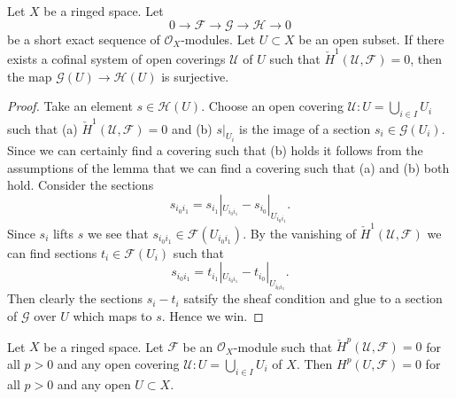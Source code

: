 \begin{lemma}
\label{lemma-ses-cech-h1}
Let $X$ be a ringed space.
Let
$$
0 \to \mathcal{F} \to \mathcal{G} \to \mathcal{H} \to 0
$$
be a short exact sequence of $\mathcal{O}_X$-modules.
Let $U \subset X$ be an open subset.
If there exists a cofinal system of open coverings $\mathcal{U}$
of $U$ such that $\check{H}^1(\mathcal{U}, \mathcal{F}) = 0$,
then the map $\mathcal{G}(U) \to \mathcal{H}(U)$ is
surjective.
\end{lemma}

\begin{proof}
Take an element $s \in \mathcal{H}(U)$. Choose an open covering
$\mathcal{U} : U = \bigcup_{i \in I} U_i$ such that
(a) $\check{H}^1(\mathcal{U}, \mathcal{F}) = 0$ and (b)
$s|_{U_i}$ is the image of a section $s_i \in \mathcal{G}(U_i)$.
Since we can certainly find a covering such that (b) holds
it follows from the assumptions of the lemma that we can find
a covering such that (a) and (b) both hold.
Consider the sections
$$
s_{i_0i_1} = s_{i_1}|_{U_{i_0i_1}} - s_{i_0}|_{U_{i_0i_1}}.
$$
Since $s_i$ lifts $s$ we see that $s_{i_0i_1} \in \mathcal{F}(U_{i_0i_1})$.
By the vanishing of $\check{H}^1(\mathcal{U}, \mathcal{F})$ we can
find sections $t_i \in \mathcal{F}(U_i)$ such that
$$
s_{i_0i_1} = t_{i_1}|_{U_{i_0i_1}} - t_{i_0}|_{U_{i_0i_1}}.
$$
Then clearly the sections $s_i - t_i$ satsify the sheaf condition
and glue to a section of $\mathcal{G}$ over $U$ which maps to $s$.
Hence we win.
\end{proof}

\begin{lemma}
\label{lemma-cech-vanish}
Let $X$ be a ringed space.
Let $\mathcal{F}$ be an $\mathcal{O}_X$-module such that
$\check{H}^p(\mathcal{U}, \mathcal{F}) = 0$ for all $p > 0$ and
any open covering $\mathcal{U} : U = \bigcup_{i \in I} U_i$ of $X$.
Then $H^p(U, \mathcal{F}) = 0$ for all $p > 0$
and any open $U \subset X$.
\end{lemma}

